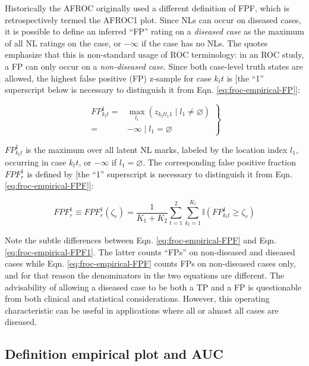 \documentclass[
]{book}
\begin{document}
Historically the AFROC originally used a different definition of FPF, which is retrospectively termed the AFROC1 plot. Since NLs can occur on diseased cases, it is possible to define an inferred ``FP'' rating on a \emph{diseased case} as the maximum of all NL ratings on the case, or \(-\infty\) if the case has no NLs. The quotes emphasize that this is non-standard usage of ROC terminology: in an ROC study, a FP can only occur on a \emph{non-diseased case}. Since both case-level truth states are allowed, the highest false positive (FP) z-sample for case \(k_t t\) is {[}the ``1'' superscript below is necessary to distinguish it from Eqn. \eqref{eq:froc-empirical-FP}{]}:

\begin{equation}
\left.
\begin{aligned}
FP_{k_t t}^1 =& \max_{l_1} \left ( z_{k_t t l_1 1 } \mid  l_1 \neq \varnothing \right )\\
=& -\infty \mid l_1 = \varnothing
\end{aligned}
\right \}
\label{eq:froc-empirical-FP1}
\end{equation}

\(FP_{k_t t}^1\) is the maximum over all latent NL marks, labeled by the location index \(l_1\), occurring in case \(k_t t\), or \(-\infty\) if \(l_1 = \varnothing\). The corresponding false positive fraction \(FPF_r^1\) is defined by {[}the ``1'' superscript is necessary to distinguish it from Eqn. \eqref{eq:froc-empirical-FPF}{]}:

\begin{equation}
FPF_r^1 \equiv FPF_r^1\left ( \zeta_r \right ) = \frac{1}{K_1+K_2}\sum_{t=1}^{2}\sum_{k_t=1}^{K_t} \mathbb{I}\left ( FP_{k_t t}^1 \geq \zeta_r \right )
\label{eq:froc-empirical-FPF1}
\end{equation}

Note the subtle differences between Eqn. \eqref{eq:froc-empirical-FPF} and Eqn. \eqref{eq:froc-empirical-FPF1}. The latter counts ``FPs'' on non-diseased and diseased cases while Eqn. \eqref{eq:froc-empirical-FPF} counts FPs on non-diseased cases only, and for that reason the denominators in the two equations are different. The advisability of allowing a diseased case to be both a TP and a FP is questionable from both clinical and statistical considerations. However, this operating characteristic can be useful in applications where all or almost all cases are diseased.

\hypertarget{froc-empirical-definition-empirical-auc-afroc1}{%
\subsection{Definition empirical plot and AUC}\label{froc-empirical-definition-empirical-auc-afroc1}}
\end{document}
